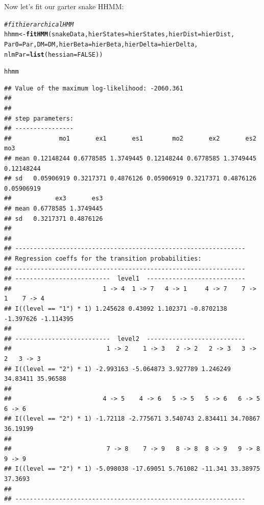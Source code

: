 \documentclass[12pt]{article}\usepackage[]{graphicx}\usepackage[]{xcolor}
\makeatletter
\newcommand{\hlnum}[1]{\textcolor[rgb]{0.686,0.059,0.569}{#1}}%
\newcommand{\hlcom}[1]{\textcolor[rgb]{0.678,0.584,0.686}{\textit{#1}}}%
\newcommand{\hldef}[1]{\textcolor[rgb]{0.345,0.345,0.345}{#1}}%
\newcommand{\hlkwb}[1]{\textcolor[rgb]{0.69,0.353,0.396}{#1}}%
\newcommand{\hlkwc}[1]{\textcolor[rgb]{0.333,0.667,0.333}{#1}}%
\newcommand{\hlkwd}[1]{\textcolor[rgb]{0.737,0.353,0.396}{\textbf{#1}}}%
\newenvironment{kframe}{%
 \def\at@end@of@kframe{}%
 \ifinner\ifhmode%
  \def\at@end@of@kframe{\end{minipage}}%
  \begin{minipage}{\columnwidth}%
 \fi\fi%
 \def\FrameCommand##1{\hskip\@totalleftmargin \hskip-\fboxsep
 \colorbox{shadecolor}{##1}\hskip-\fboxsep
     \hskip-\linewidth \hskip-\@totalleftmargin \hskip\columnwidth}%
 \MakeFramed {\advance\hsize-\width
   \@totalleftmargin\z@ \linewidth\hsize
   \@setminipage}}%
 {\par\unskip\endMakeFramed%
 \at@end@of@kframe}
\newenvironment{knitrout}{}{} %
\makeatother
\begin{document}
Now let's fit our garter snake HHMM:
\begin{knitrout}
\color{fgcolor}\begin{kframe}
\begin{alltt}
\hlcom{# fit hierarchical HMM}
\hldef{hhmm} \hlkwb{<-} \hlkwd{fitHMM}\hldef{(snakeData,}\hlkwc{hierStates}\hldef{=hierStates,}\hlkwc{hierDist}\hldef{=hierDist,}
               \hlkwc{Par0}\hldef{=Par,}\hlkwc{DM}\hldef{=DM,}\hlkwc{hierBeta}\hldef{=hierBeta,}\hlkwc{hierDelta}\hldef{=hierDelta,}
               \hlkwc{nlmPar}\hldef{=}\hlkwd{list}\hldef{(}\hlkwc{hessian}\hldef{=}\hlnum{FALSE}\hldef{))}
\end{alltt}
\end{kframe}
\end{knitrout}
\begin{knitrout}
\color{fgcolor}\begin{kframe}
\begin{alltt}
\hldef{hhmm}
\end{alltt}
\begin{verbatim}
## Value of the maximum log-likelihood: -2060.361 
## 
## 
## step parameters:
## ----------------
##             mo1       ex1       es1        mo2       ex2       es2        mo3
## mean 0.12148244 0.6778585 1.3749445 0.12148244 0.6778585 1.3749445 0.12148244
## sd   0.05906919 0.3217371 0.4876126 0.05906919 0.3217371 0.4876126 0.05906919
##            ex3       es3
## mean 0.6778585 1.3749445
## sd   0.3217371 0.4876126
## 
## 
## ---------------------------------------------------------------
## Regression coeffs for the transition probabilities:
## ---------------------------------------------------------------
## --------------------------  level1  ---------------------------
##                         1 -> 4  1 -> 7   4 -> 1     4 -> 7    7 -> 1    7 -> 4
## I((level == "1") * 1) 1.245628 0.43092 1.102371 -0.8702138 -1.397626 -1.114395
## 
## --------------------------  level2  ---------------------------
##                          1 -> 2    1 -> 3   2 -> 2   2 -> 3   3 -> 2   3 -> 3
## I((level == "2") * 1) -2.993163 -5.064873 3.927789 1.246249 34.83411 35.96588
## 
##                         4 -> 5    4 -> 6   5 -> 5   5 -> 6   6 -> 5   6 -> 6
## I((level == "2") * 1) -1.72118 -2.775671 3.540743 2.834411 34.70867 36.19199
## 
##                          7 -> 8    7 -> 9   8 -> 8  8 -> 9   9 -> 8  9 -> 9
## I((level == "2") * 1) -5.098038 -17.69051 5.761082 -11.341 33.38975 37.3693
## 
## ---------------------------------------------------------------

\end{verbatim}
\end{kframe}
\end{knitrout}
\end{document}
